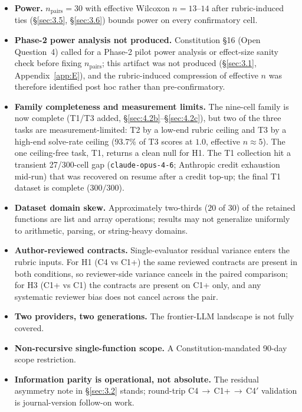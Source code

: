 \documentclass[11pt]{article}
\begin{document}
\begin{itemize}
\item \textbf{Power.} $n_{\text{pairs}} = 30$ with effective
  Wilcoxon $n = 13$--$14$ after rubric-induced ties
  (\S\ref{sec:3.5}, \S\ref{sec:3.6}) bounds power on every
  confirmatory cell.
\item \textbf{Phase-2 power analysis not produced.}
  Constitution \S16 (Open Question~4) called for a Phase-2 pilot
  power analysis or effect-size sanity check before fixing
  $n_{\text{pairs}}$; this artifact was not produced (\S\ref{sec:3.1},
  Appendix~\ref{app:E}), and the rubric-induced compression of
  effective $n$ was therefore identified post hoc rather than
  pre-confirmatory.
\item \textbf{Family completeness and measurement limits.} The
  nine-cell family is now complete (T1/T3 added,
  \S\ref{sec:4.2b}--\S\ref{sec:4.2c}), but two of the three tasks are
  measurement-limited: T2 by a low-end rubric ceiling and T3 by a
  high-end solve-rate ceiling (93.7\% of T3 scores at $1.0$, effective
  $n \approx 5$). The one ceiling-free task, T1, returns a clean null
  for H1. The T1 collection hit a transient 27/300-cell gap
  (\texttt{claude-opus-4-6}; Anthropic credit exhaustion mid-run) that was
  recovered on resume after a credit top-up; the final T1 dataset is
  complete ($300/300$).
\item \textbf{Dataset domain skew.} Approximately two-thirds
  ($20$ of $30$) of the retained functions are list and array
  operations; results may not generalize uniformly to arithmetic,
  parsing, or string-heavy domains.
\item \textbf{Author-reviewed contracts.} Single-evaluator
  residual variance enters the rubric inputs. For H1 (C4 vs
  C1+) the same reviewed contracts are present in both
  conditions, so reviewer-side variance cancels in the paired
  comparison; for H3 (C1+ vs C1) the contracts are present on
  C1+ only, and any systematic reviewer bias does not cancel
  across the pair.
\item \textbf{Two providers, two generations.} The
  frontier-LLM landscape is not fully covered.
\item \textbf{Non-recursive single-function scope.} A
  Constitution-mandated 90-day scope restriction.
\item \textbf{Information parity is operational, not absolute.}
  The residual asymmetry note in \S\ref{sec:3.2} stands;
  round-trip C4\,$\to$\,C1+\,$\to$\,C4$'$ validation is
  journal-version follow-on work.
\end{itemize}
\end{document}
